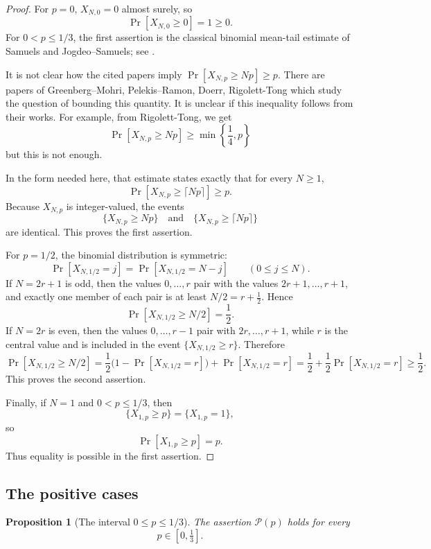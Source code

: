 \documentclass[12pt]{article}
\theoremstyle{definition}
\theoremstyle{plain}
\newtheorem{proposition}[definition]{Proposition}
\theoremstyle{remark}
\newcommand{\review}[1]{\begin{reviewbox}#1\end{reviewbox}}
\begin{document}
\begin{proof}
For \(p=0\), \(X_{N,0}=0\) almost surely, so
\[
\Pr[X_{N,0}\ge0]=1\ge0.
\]
For \(0<p\le1/3\), the first assertion is the classical binomial mean-tail estimate of Samuels and Jogdeo--Samuels; see \cite{Samuels1965,JogdeoSamuels1968}. 

\review{It is not clear how the cited papers imply $\Pr[X_{N, p} \geq Np] \geq p$. There are papers of Greenberg–Mohri, Pelekis–Ramon, Doerr, Rigolett-Tong which study the question of bounding this quantity. It is unclear if this inequality follows from their works. For example, from Rigolett-Tong, we get 
\[
    \Pr[X_{N, p} \geq Np] \geq \min \left \{ \frac{1}{4}, p \right \}
\]
but this is not enough. 
}

In the form needed here, that estimate states exactly that for every \(N\ge1\),
\[
\Pr[X_{N,p}\ge \lceil Np\rceil]\ge p.
\]
Because \(X_{N,p}\) is integer-valued, the events
\[
\{X_{N,p}\ge Np\}
\quad\text{and}\quad
\{X_{N,p}\ge \lceil Np\rceil\}
\]
are identical. This proves the first assertion.

For \(p=1/2\), the binomial distribution is symmetric:
\[
\Pr[X_{N,1/2}=j]=\Pr[X_{N,1/2}=N-j]
\qquad (0\le j\le N).
\]
If \(N=2r+1\) is odd, then the values \(0,\ldots,r\) pair with the values \(2r+1,\ldots,r+1\), and exactly one member of each pair is at least \(N/2=r+\frac12\). Hence
\[
\Pr[X_{N,1/2}\ge N/2]=\frac12.
\]
If \(N=2r\) is even, then the values \(0,\ldots,r-1\) pair with \(2r,\ldots,r+1\), while \(r\) is the central value and is included in the event \(\{X_{N,1/2}\ge r\}\). Therefore
\[
\Pr[X_{N,1/2}\ge N/2]
=
\frac12\bigl(1-\Pr[X_{N,1/2}=r]\bigr)
+\Pr[X_{N,1/2}=r]
=
\frac12+\frac12\Pr[X_{N,1/2}=r]
\ge\frac12.
\]
This proves the second assertion.

Finally, if \(N=1\) and \(0<p\le1/3\), then
\[
\{X_{1,p}\ge p\}=\{X_{1,p}=1\},
\]
so
\[
\Pr[X_{1,p}\ge p]=p.
\]
Thus equality is possible in the first assertion.
\end{proof}

\subsection{The positive cases}

\begin{proposition}[The interval \(0\le p\le1/3\)]\label{prop:smallp}
The assertion \(\mathcal P(p)\) holds for every
\[
p\in[0,\tfrac13].
\]
\end{proposition}
\end{document}
